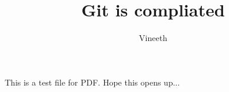 \documentclass[10pt]{article}
\author{Vineeth}
\title{Git is compliated}
\begin{document}
	\maketitle

	This is a test file for PDF.
	Hope this opens up...
\end{document}

